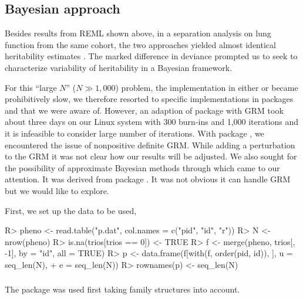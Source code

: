 \documentclass[article]{jss}
\begin{document}
\subsection{Bayesian approach}

Besides results from REML shown above, in a separation analysis on lung 
function from the same cohort, the two approaches yielded almost 
identical heritability estimates \citep{klimentdis13}. The marked 
difference in deviance prompted us to seek to characterize variability of 
heritability in a Bayesian framework.

For this ``large $N$'' ($N \gg 1,000$) problem, the implementation in
either  or  became prohibitively slow, we
therefore resorted to specific implementations in packages
 and  that we were aware of. However, an
adaption of package  with GRM took about three days on
our Linux system with 300 burn-ins and 1,000 iterations and it is
infeasible to consider large number of iterations. With package
, we encountered the issue of nonpositive definite GRM. While
adding a perturbation to the GRM it was not clear how our results will
be adjusted.  We also sought for the possibility of approximate
Bayesian methods through which  \citep{holand13} came
to our attention. It was derived from package  \citep[integrated
nested Laplace approximation;][]{rue14}. It was not obvious it can
handle GRM but we would like to explore.

First, we set up the data to be used,
%
\begin{Schunk}
\begin{Sinput}
R> pheno <- read.table("p.dat", col.names = c("pid", "id", "r"))
R> N <- nrow(pheno)
R> is.na(trios[trios == 0]) <- TRUE
R> f <- merge(pheno, trios[, -1], by = "id", all = TRUE)
R> p <- data.frame(f[with(f, order(pid, id)), ], u = seq_len(N),
+    e = seq_len(N))
R> rownames(p) <- seq_len(N)
\end{Sinput}
\end{Schunk}
%
\subsubsection[AnimalINLA]{}

The  package was used first taking family structures
into account.
\end{document}

